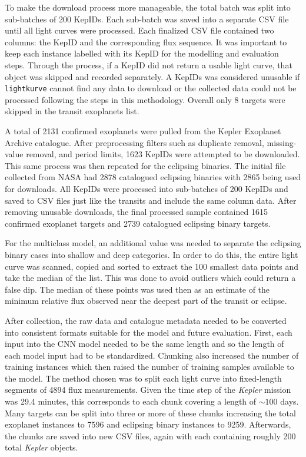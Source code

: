 To make the download process more manageable, the total batch was split into sub-batches of 200 KepIDs. Each sub-batch was saved into a separate CSV file until all light curves were processed. Each finalized CSV file contained two columns: the KepID and the corresponding flux sequence. It was important to keep each instance labelled with its KepID for the modelling and evaluation steps. Through the process, if a KepID did not return a usable light curve, that object was skipped and recorded separately. A KepIDs was considered unusable if \texttt{lightkurve} cannot find any data to download or the collected data could not be processed following the steps in this methodology. Overall only 8 targets were skipped in the transit exoplanets list.

A total of 2131 confirmed exoplanets were pulled from the Kepler Exoplanet Archive catalogue. After preprocessing filters such as duplicate removal, missing-value removal, and period limits, 1623 KepIDs were attempted to be downloaded. This same process was then repeated for the eclipsing binaries. The initial file collected from NASA had 2878 catalogued eclipsing binaries with 2865 being used for downloads. All KepIDs were processed into sub-batches of 200 KepIDs and saved to CSV files just like the transits and include the same column data. After removing unusable downloads, the final processed sample contained 1615 confirmed exoplanet targets and 2739 catalogued eclipsing binary targets. 

For the multiclass model, an additional value was needed to separate the eclipsing binary cases into shallow and deep categories. In order to do this, the entire light curve was scanned, copied and sorted to extract the 100 smallest data points and take the median of the list. This was done to avoid outliers which could return a false dip. The median of these points was used then as an estimate of the minimum relative flux observed near the deepest part of the transit or eclipse.

After collection, the raw data and catalogue metadata needed to be converted into consistent formats suitable for the model and future evaluation. First, each input into the CNN model needed to be the same length and so the length of each model input had to be standardized. Chunking also increased the number of training instances which then raised the number of training samples available to the model. The method chosen was to split each light curve into fixed-length segments of 4894 flux measurements. Given the time step of the \textit{Kepler} mission was 29.4 minutes, this corresponds to each chunk covering a length of $\sim 100$ days. Many targets can be split into three or more of these chunks increasing the total exoplanet instances to 7596 and eclipsing binary instances to 9259. Afterwards, the chunks are saved into new CSV files, again with each containing roughly 200 total \textit{Kepler} objects. 

